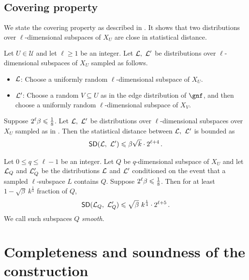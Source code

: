 \documentclass{toc}
\newcommand\eigth{{1\over8}}
\renewcommand\geq{\geqslant}
\renewcommand\leq{\leqslant}
\renewcommand\subset{\subseteq}
\def\U{\mathcal{U}}
\def\V{\mathcal{V}}
\begin{document}
%
%
%
\subsection{Covering property}\label{section:covering}

We state the covering property as described in \cite[Lemmas 4.6, 4.7]{KMS}.
It shows that two distributions over $\ell$-dimensional subspaces of $X_U$ are
close in statistical distance.
\begin{definition}\label{def:covering_dist}
Let $U\in\U$ and let $\ell \geq 1$ be an integer. Let ${\cal L}, ~{\cal L}'$ be distributions over $\ell$-dimensional subspaces of $X_{U}$ sampled as follows.
\begin{itemize}
\item ${\cal L}$: Choose  a uniformly random $\ell$-dimensional subspace of $X_{U}$.
\item ${\cal L'}$: Choose a random $V\subset U$ as in the edge distribution of $\gnf$, and then choose a uniformly random $\ell$-dimensional subspace of $X_{V}$.
\end{itemize}
\end{definition}

\begin{lemma}\label{lemma:covering_normal}
Suppose $2^{\ell}\beta \leqslant \eigth$. Let ${\cal L}, ~{\cal L}'$ be distributions over $\ell$-dimensional subspaces over $X_{U}$
 sampled as in . Then the statistical
distance between ${\cal L}, ~{\cal L}'$ is bounded as
$$
{\sf SD}({\cal L}, ~{\cal L}')\leqslant  \beta \sqrt{k}\cdot 2^{\ell+4}\,. $$ %
\end{lemma}


\begin{lemma}\label{lemma:covering_cond_markov}
Let $0 \leq q \leq \ell-1$ be an integer. Let $Q$ be
$q$-dimensional subspace of $X_{U}$ and let ${\cal L}_Q$ and ${\cal
  L}'_Q$ be the
distributions ${\cal L}$ and ${\cal L}'$ conditioned on the event that a sampled $\ell$-subspace $L$ contains $Q$.
Suppose $2^{\ell}\beta \leqslant \eigth$. Then for at least $1 - \sqrt{\beta}~k^{\frac{1}{4}} $
fraction of $Q$,
\begin{equation}\label{eq:SD_cond_Q}
{\sf SD}  ({\cal L}_Q, ~{\cal L}'_Q ) \leqslant \sqrt{\beta} ~k^{\frac{1}{4}} \cdot 2^{\ell+5}\,.
\end{equation}
We call such subspaces $Q$ {\em smooth}.
\end{lemma}
\section{Completeness and soundness of the construction}
\def\V{{\cal V}}
\def\D{{\cal D}}
\def\Vsat{\V_{sat}}
\def\eq{{\sf Eq}}
\end{document}
